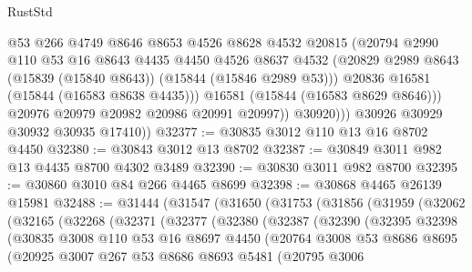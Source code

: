 \begin{lexlean}{RustStd}
\begin{coremodule}
                    @53
                    @266
                    @4749
                    @8646
                    @8653
                    @4526
                    @8628
                    @4532
                    @20815
                    (@20794
                      @2990
                      @110
                      @53
                      @16
                      @8643
                      @4435
                      @4450
                      @4526
                      @8637
                      @4532
                      (@20829 @2989 @8643 (@15839 (@15840 @8643)) (@15844 (@15846 @2989 @53)))
                      @20836
                      @16581
                      (@15844 (@16583 @8638 @4435)))
                    @16581
                    (@15844 (@16583 @8629 @8646)))
                  @20976
                  @20979
                  @20982
                  @20986
                  @20991
                  @20997))
              @30920)))
        @30926
        @30929
        @30932
        @30935
        @17410))
@32377 := @30835 @3012 @110 @13 @16 @8702 @4450
@32380 := @30843 @3012 @13 @8702
@32387 := @30849 @3011 @982 @13 @4435 @8700 @4302 @3489
@32390 := @30830 @3011 @982 @8700
@32395 := @30860 @3010 @84 @266 @4465 @8699
@32398 := @30868 @4465 @26139 @15981
@32488 := @31444
    (@31547
      (@31650
        (@31753
          (@31856
            (@31959
              (@32062
                (@32165
                  (@32268
                    (@32371
                      (@32377
                        (@32380
                          (@32387
                            (@32390
                              (@32395
                                @32398
                                (@30835
                                  @3008
                                  @110
                                  @53
                                  @16
                                  @8697
                                  @4450
                                  (@20764
                                    @3008
                                    @53
                                    @8686
                                    @8695
                                    (@20925
                                      @3007
                                      @267
                                      @53
                                      @8686
                                      @8693
                                      @5481
                                      (@20795
                                        @3006

\end{coremodule}
\end{lexlean}
